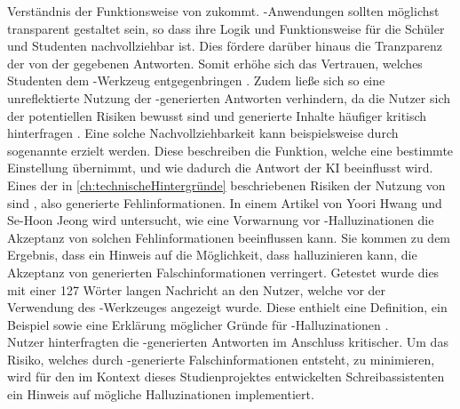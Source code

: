 \documentclass[../main.tex]{subfiles}
\begin{document}
Verständnis der Funktionsweise von  zukommt. -Anwendungen sollten möglichst transparent gestaltet sein, so dass ihre Logik und Funktionsweise für die Schüler und 
Studenten nachvollziehbar ist. Dies fördere darüber hinaus die Tranzparenz der von der  gegebenen Antworten. Somit erhöhe sich das Vertrauen, welches Studenten dem -Werkzeug 
entgegenbringen \cite[10]{influencingUsingAi}. Zudem ließe sich so eine unreflektierte Nutzung der -generierten Antworten verhindern, da die Nutzer sich der 
potentiellen Risiken bewusst sind und generierte Inhalte häufiger kritisch hinterfragen \cite[10]{influencingUsingAi}. Eine solche Nachvollziehbarkeit kann 
beispielsweise durch sogenannte  erzielt werden. Diese beschreiben die Funktion, welche eine bestimmte Einstellung übernimmt, und wie dadurch die Antwort der 
KI beeinflusst wird.\\  
Eines der in \autoref{ch:technischeHintergründe} beschriebenen Risiken der Nutzung von  sind , also generierte Fehlinformationen. In einem Artikel von Yoori Hwang und Se-Hoon Jeong wird untersucht, 
wie eine Vorwarnung vor -Halluzinationen die Akzeptanz von solchen Fehlinformationen beeinflussen kann. Sie kommen zu dem Ergebnis, dass ein Hinweis auf 
die Möglichkeit, dass  halluzinieren kann, die Akzeptanz von generierten Falschinformationen verringert. Getestet wurde dies mit einer 127 Wörter langen Nachricht an 
den Nutzer, welche vor der Verwendung des -Werkzeuges angezeigt wurde. Diese enthielt eine Definition, ein Beispiel sowie eine Erklärung möglicher Gründe für -Halluzinationen \cite[285]{hallucinationForewarning}. \\Nutzer hinterfragten die -generierten Antworten im Anschluss kritischer. Um das Risiko, welches durch -generierte Falschinformationen 
entsteht, zu minimieren, wird für den im Kontext dieses Studienprojektes entwickelten Schreibassistenten ein Hinweis auf mögliche Halluzinationen implementiert. \cite{hallucinationForewarning}
\end{document}
